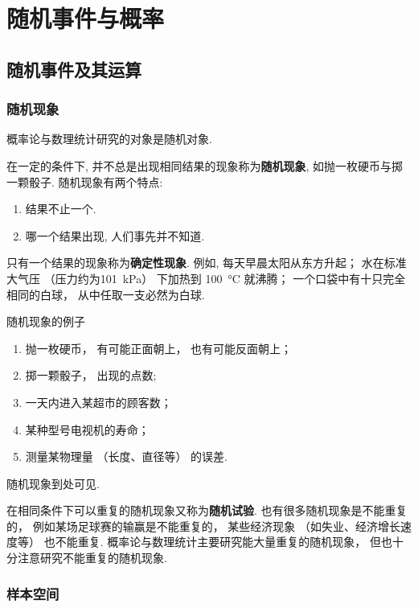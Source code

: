 \chapter{随机事件与概率}
\section{随机事件及其运算}
\subsection{随机现象}

概率论与数理统计研究的对象是随机对象.

在一定的条件下, 并不总是出现相同结果的现象称为\textbf{随机现象},
如抛一枚硬币与掷一颗骰子.
随机现象有两个特点:
\begin{enumerate}
	\item 结果不止一个.
  \item 哪一个结果出现,
  人们事先并不知道.
\end{enumerate}

只有一个结果的现象称为\textbf{确定性现象}.
例如,
每天早晨太阳从东方升起；
水在标准大气压 （压力约为\SI{101}{\kilo\pascal}） 下加热到 \SI{100}{\degreeCelsius} 就沸腾；
一个口袋中有十只完全相同的白球，
从中任取一支必然为白球.

\begin{example}\label{exam:1.1.1}
	随机现象的例子
	\begin{enumerate}
    \item 抛一枚硬币，
    有可能正面朝上，
    也有可能反面朝上；
    \item 掷一颗骰子，
    出现的点数;
		\item 一天内进入某超市的顾客数；
		\item 某种型号电视机的寿命；
		\item 测量某物理量 （长度、直径等） 的误差.
	\end{enumerate}
\end{example}

随机现象到处可见.
	
在相同条件下可以重复的随机现象又称为\textbf{随机试验}.
也有很多随机现象是不能重复的，
例如某场足球赛的输赢是不能重复的，
某些经济现象 （如失业、经济增长速度等） 也不能重复.
概率论与数理统计主要研究能大量重复的随机现象，
但也十分注意研究不能重复的随机现象.

\subsection{样本空间}
	
